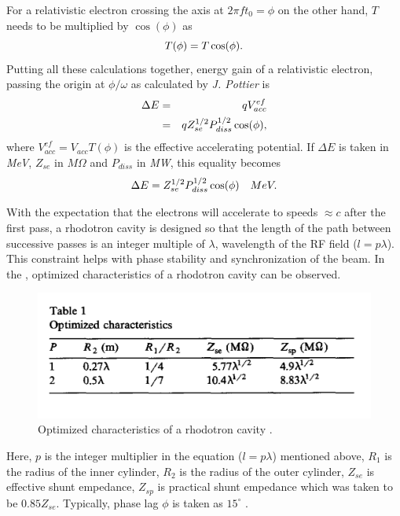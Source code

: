 \documentclass{article}
\begin{document}
For a relativistic electron crossing the axis at $2\pi f t_0 = \phi$ on the other hand, $T$ needs to be multiplied by $\cos(\phi)$ as
\vspace{-10pt}\begin{equation}
    T(\phi) = T \cos(\phi) .
\vspace{-10pt}\end{equation} 
Putting all these calculations together, energy gain of a relativistic electron, passing the origin at $\phi / \omega$ as calculated by \textit{J. Pottier} is \cite{rhodo_pottier}
\vspace{-10pt}\begin{eqnarray}
    \Delta E &=& q V_{acc}^{ef} \nonumber\\
             &=& q Z_{se}^{1/2}P_{diss}^{1/2} \cos(\phi)  ,
\vspace{-20pt}\end{eqnarray}
where $ V_{acc}^{ef} = V_{acc} T(\phi)$ is the effective accelerating potential.
If $\Delta E$ is taken in \textit{MeV}, $Z_{se}$ in $M\Omega$ and $P_{diss}$ in \textit{MW}, this equality becomes
\vspace{-10pt}\begin{equation} \label{eq:W_gain_each_pass_pottier}
    \Delta E = Z_{se}^{1/2}P_{diss}^{1/2} \cos(\phi) \quad MeV .
\vspace{-10pt}\end{equation}


With the expectation that the electrons will accelerate to speeds $\approx c$ after the first pass, a rhodotron cavity is designed so that the length of the path between successive passes is an integer multiple of $\lambda$, wavelength of the RF field ($l=p\lambda \label{eq:lpl}$).
This constraint helps with  phase stability and synchronization of the beam.
In the , optimized characteristics of a rhodotron cavity can be observed. 
\begin{figure}[H]
    \centering
    \includegraphics[width=.9\textwidth]{../../../figures/pottier_table1.png}
    \caption{Optimized characteristics of a rhodotron cavity \cite{rhodo_pottier}.}
    \label{fig:pottier_table1}
\end{figure}
Here, $p$ is the integer multiplier in the equation ($l=p\lambda$) mentioned above, $R_1$ is the radius of the inner cylinder, $R_2$ is the radius of the outer cylinder, 
$Z_{se}$ is effective shunt empedance, $Z_{sp}$ is practical shunt empedance which was taken to be $0.85 Z_{se}$. Typically, phase lag $\phi$ is taken as $15^\circ$ \cite{rhodo_pottier}. 
\end{document}
